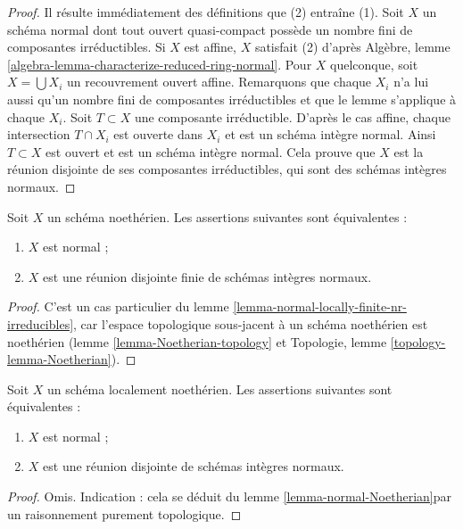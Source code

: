 \begin{proof}
Il résulte immédiatement des définitions que (2) entraîne (1).
Soit $X$ un schéma normal dont tout ouvert quasi-compact
possède un nombre fini de composantes irréductibles.
Si $X$ est affine, $X$ satisfait (2)
d'après Algèbre, lemme \ref{algebra-lemma-characterize-reduced-ring-normal}.
Pour $X$ quelconque, soit $X = \bigcup X_i$ un
recouvrement ouvert affine. Remarquons que chaque $X_i$ n'a
lui aussi qu'un nombre fini de composantes irréductibles et que le lemme
s'applique à chaque $X_i$. Soit $T \subset X$ une composante irréductible.
D'après le cas affine, chaque intersection $T \cap X_i$ est ouverte dans $X_i$
et est un schéma intègre normal.
Ainsi $T \subset X$ est ouvert et est un schéma intègre
normal. Cela prouve que $X$ est la réunion disjointe de ses composantes irréductibles,
qui sont des schémas intègres normaux.
\end{proof}

\begin{lemma}
\label{lemma-normal-Noetherian}
Soit $X$ un schéma noethérien. Les
assertions suivantes sont équivalentes :
\begin{enumerate}
\item $X$ est normal ;
\item $X$ est une réunion disjointe finie de schémas intègres normaux.
\end{enumerate}
\end{lemma}

\begin{proof}
C'est un cas particulier du
lemme \ref{lemma-normal-locally-finite-nr-irreducibles}, car l'espace
topologique sous-jacent à un schéma noethérien est noethérien
(lemme \ref{lemma-Noetherian-topology}
et
Topologie, lemme \ref{topology-lemma-Noetherian}).
\end{proof}

\begin{lemma}
\label{lemma-normal-locally-Noetherian}
Soit $X$ un schéma localement noethérien. Les
assertions suivantes sont équivalentes :
\begin{enumerate}
\item $X$ est normal ;
\item $X$ est une réunion disjointe de schémas intègres normaux.
\end{enumerate}
\end{lemma}

\begin{proof}
Omis. Indication : cela se déduit du
lemme \ref{lemma-normal-Noetherian}par un raisonnement purement topologique.
\end{proof}

